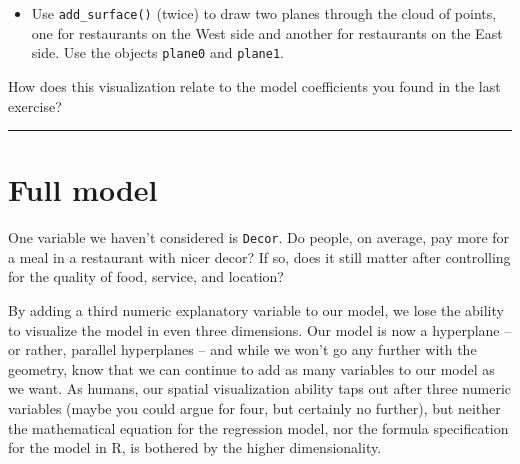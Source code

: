 \documentclass[
]{book}
\newenvironment{Shaded}{\begin{snugshade}}{\end{snugshade}}
\newcommand{\CommentTok}[1]{\textcolor[rgb]{0.56,0.35,0.01}{\textit{#1}}}
\newcommand{\DataTypeTok}[1]{\textcolor[rgb]{0.13,0.29,0.53}{#1}}
\newcommand{\KeywordTok}[1]{\textcolor[rgb]{0.13,0.29,0.53}{\textbf{#1}}}
\newcommand{\NormalTok}[1]{#1}
\newcommand{\OperatorTok}[1]{\textcolor[rgb]{0.81,0.36,0.00}{\textbf{#1}}}
\newcommand{\OtherTok}[1]{\textcolor[rgb]{0.56,0.35,0.01}{#1}}
\newcommand{\StringTok}[1]{\textcolor[rgb]{0.31,0.60,0.02}{#1}}
\providecommand{\tightlist}{%
  \setlength{\itemsep}{0pt}\setlength{\parskip}{0pt}}
\begin{document}
\begin{itemize}
\tightlist
\item
  Use \texttt{add\_surface()} (twice) to draw two planes through the cloud of points, one for restaurants on the West side and another for restaurants on the East side. Use the objects \texttt{plane0} and \texttt{plane1}.
\end{itemize}

\begin{Shaded}
\end{Shaded}

How does this visualization relate to the model coefficients you found in the last exercise?

\begin{center}\rule{0.5\linewidth}{0.5pt}\end{center}

\hypertarget{full-model}{%
\section{Full model}\label{full-model}}

One variable we haven't considered is \texttt{Decor}. Do people, on average, pay more for a meal in a restaurant with nicer decor? If so, does it still matter after controlling for the quality of food, service, and location?

By adding a third numeric explanatory variable to our model, we lose the ability to visualize the model in even three dimensions. Our model is now a hyperplane -- or rather, parallel hyperplanes -- and while we won't go any further with the geometry, know that we can continue to add as many variables to our model as we want. As humans, our spatial visualization ability taps out after three numeric variables (maybe you could argue for four, but certainly no further), but neither the mathematical equation for the regression model, nor the formula specification for the model in R, is bothered by the higher dimensionality.
\end{document}
